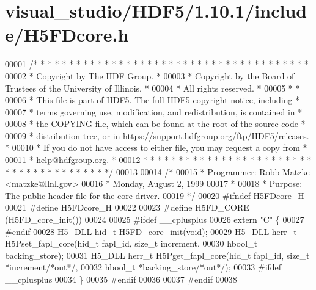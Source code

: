 \hypertarget{visual__studio_2_h_d_f5_21_810_81_2include_2_h5_f_dcore_8h_source}{}\section{visual\+\_\+studio/\+H\+D\+F5/1.10.1/include/\+H5\+F\+Dcore.h}
\label{visual__studio_2_h_d_f5_21_810_81_2include_2_h5_f_dcore_8h_source}

\begin{DoxyCode}
00001 \textcolor{comment}{/* * * * * * * * * * * * * * * * * * * * * * * * * * * * * * * * * * * * * * *}
00002 \textcolor{comment}{ * Copyright by The HDF Group.                                               *}
00003 \textcolor{comment}{ * Copyright by the Board of Trustees of the University of Illinois.         *}
00004 \textcolor{comment}{ * All rights reserved.                                                      *}
00005 \textcolor{comment}{ *                                                                           *}
00006 \textcolor{comment}{ * This file is part of HDF5.  The full HDF5 copyright notice, including     *}
00007 \textcolor{comment}{ * terms governing use, modification, and redistribution, is contained in    *}
00008 \textcolor{comment}{ * the COPYING file, which can be found at the root of the source code       *}
00009 \textcolor{comment}{ * distribution tree, or in https://support.hdfgroup.org/ftp/HDF5/releases.  *}
00010 \textcolor{comment}{ * If you do not have access to either file, you may request a copy from     *}
00011 \textcolor{comment}{ * help@hdfgroup.org.                                                        *}
00012 \textcolor{comment}{ * * * * * * * * * * * * * * * * * * * * * * * * * * * * * * * * * * * * * * */}
00013 
00014 \textcolor{comment}{/*}
00015 \textcolor{comment}{ * Programmer:  Robb Matzke <matzke@llnl.gov>}
00016 \textcolor{comment}{ *              Monday, August  2, 1999}
00017 \textcolor{comment}{ *}
00018 \textcolor{comment}{ * Purpose: The public header file for the core driver.}
00019 \textcolor{comment}{ */}
00020 \textcolor{preprocessor}{#ifndef H5FDcore\_H}
00021 \textcolor{preprocessor}{#define H5FDcore\_H}
00022 
00023 \textcolor{preprocessor}{#define H5FD\_CORE   (H5FD\_core\_init())}
00024 
00025 \textcolor{preprocessor}{#ifdef \_\_cplusplus}
00026 \textcolor{keyword}{extern} \textcolor{stringliteral}{"C"} \{
00027 \textcolor{preprocessor}{#endif}
00028 H5\_DLL hid\_t H5FD\_core\_init(\textcolor{keywordtype}{void});
00029 H5\_DLL herr\_t H5Pset\_fapl\_core(hid\_t fapl\_id, \textcolor{keywordtype}{size\_t} increment,
00030                 hbool\_t backing\_store);
00031 H5\_DLL herr\_t H5Pget\_fapl\_core(hid\_t fapl\_id, \textcolor{keywordtype}{size\_t} *increment\textcolor{comment}{/*out*/},
00032                 hbool\_t *backing\_store\textcolor{comment}{/*out*/});
00033 \textcolor{preprocessor}{#ifdef \_\_cplusplus}
00034 \}
00035 \textcolor{preprocessor}{#endif}
00036 
00037 \textcolor{preprocessor}{#endif}
00038 
\end{DoxyCode}
